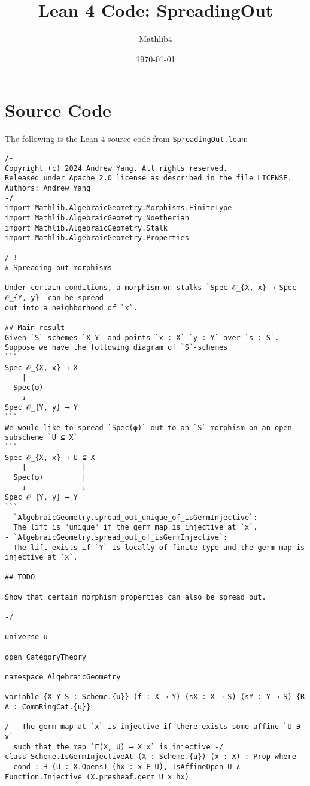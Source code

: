 \documentclass{article}
\title{Lean 4 Code: SpreadingOut}
\author{Mathlib4}
\date{\today}
\begin{document}
\maketitle

\section{Source Code}

The following is the Lean 4 source code from \texttt{SpreadingOut.lean}:

\begin{lstlisting}[language=Lean, caption={SpreadingOut.lean}]
/-
Copyright (c) 2024 Andrew Yang. All rights reserved.
Released under Apache 2.0 license as described in the file LICENSE.
Authors: Andrew Yang
-/
import Mathlib.AlgebraicGeometry.Morphisms.FiniteType
import Mathlib.AlgebraicGeometry.Noetherian
import Mathlib.AlgebraicGeometry.Stalk
import Mathlib.AlgebraicGeometry.Properties

/-!
# Spreading out morphisms

Under certain conditions, a morphism on stalks `Spec 𝒪_{X, x} ⟶ Spec 𝒪_{Y, y}` can be spread
out into a neighborhood of `x`.

## Main result
Given `S`-schemes `X Y` and points `x : X` `y : Y` over `s : S`.
Suppose we have the following diagram of `S`-schemes
```
Spec 𝒪_{X, x} ⟶ X
    |
  Spec(φ)
    ↓
Spec 𝒪_{Y, y} ⟶ Y
```
We would like to spread `Spec(φ)` out to an `S`-morphism on an open subscheme `U ⊆ X`
```
Spec 𝒪_{X, x} ⟶ U ⊆ X
    |             |
  Spec(φ)         |
    ↓             ↓
Spec 𝒪_{Y, y} ⟶ Y
```
- `AlgebraicGeometry.spread_out_unique_of_isGermInjective`:
  The lift is "unique" if the germ map is injective at `x`.
- `AlgebraicGeometry.spread_out_of_isGermInjective`:
  The lift exists if `Y` is locally of finite type and the germ map is injective at `x`.

## TODO

Show that certain morphism properties can also be spread out.

-/

universe u

open CategoryTheory

namespace AlgebraicGeometry

variable {X Y S : Scheme.{u}} (f : X ⟶ Y) (sX : X ⟶ S) (sY : Y ⟶ S) {R A : CommRingCat.{u}}

/-- The germ map at `x` is injective if there exists some affine `U ∋ x`
  such that the map `Γ(X, U) ⟶ X_x` is injective -/
class Scheme.IsGermInjectiveAt (X : Scheme.{u}) (x : X) : Prop where
  cond : ∃ (U : X.Opens) (hx : x ∈ U), IsAffineOpen U ∧ Function.Injective (X.presheaf.germ U x hx)


\end{lstlisting}
\end{document}
